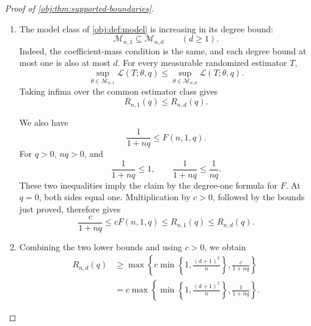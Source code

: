 \begin{proof}[Proof of \cref{obj:thm:supported-boundaries}]
\begin{enumerate}
Finally, the rounding bound gives
\[
\frac mn\ge\frac14,
\qquad
\frac{\kappa s}{4}
\le\frac{m\kappa s}{n}.
\]
Both sides of the latter inequality are positive, so
\[
\left(\frac{\kappa s}{4}\right)^2
\le
\left(\frac{m\kappa s}{n}\right)^2,
\qquad
\frac14\left(\frac{\kappa s}{4}\right)^2
=
\frac{s^2}{640000\pi^2}.
\]
Combining these estimates with \(F(n,1,q)\le s^2\) gives
\[
\begin{aligned}
cF(n,1,q)
&\le \frac{s^2}{2560000\pi^2}\\
&\le \frac{s^2}{640000\pi^2}\\
&=\frac14\left(\frac{\kappa s}{4}\right)^2\\
&\le\frac14\left(\frac{m\kappa s}{n}\right)^2\\
&\le R_{n,1}(q).
\end{aligned}
\]
Together with the first case, this proves the degree-one frontier bound.

\item The model class of \cref{obj:def:model} is increasing in its degree bound:
\[
\mathcal M_{n,1}\subseteq\mathcal M_{n,d}
\qquad(d\ge1).
\]
Indeed, the coefficient-mass condition is the same, and each degree bound at most one is also at most \(d\). For every measurable randomized estimator \(T\),
\[
\sup_{\theta\in\mathcal M_{n,1}}\mathcal L(T;\theta,q)
\le
\sup_{\theta\in\mathcal M_{n,d}}\mathcal L(T;\theta,q).
\]
Taking infima over the common estimator class gives
\[
R_{n,1}(q)\le R_{n,d}(q).
\]

We also have
\[
\frac1{1+nq}\le F(n,1,q).
\]
For \(q>0\), \(nq>0\), and
\[
\frac1{1+nq}\le1,
\qquad
\frac1{1+nq}\le\frac1{nq}.
\]
These two inequalities imply the claim by the degree-one formula for \(F\). At \(q=0\), both sides equal one. Multiplication by \(c>0\), followed by the bounds just proved, therefore gives
\[
\frac{c}{1+nq}
\le cF(n,1,q)
\le R_{n,1}(q)
\le R_{n,d}(q).
\]

\item Combining the two lower bounds and using \(c>0\), we obtain
\[
\begin{aligned}
R_{n,d}(q)
&\ge
\max\left\{
c\min\left\{1,\frac{(d+1)^2}{n}\right\},
\frac{c}{1+nq}
\right\}\\
&=
c\max\left\{
\min\left\{1,\frac{(d+1)^2}{n}\right\},
\frac1{1+nq}
\right\}.
\end{aligned}
\]


\end{enumerate}
\end{proof}
